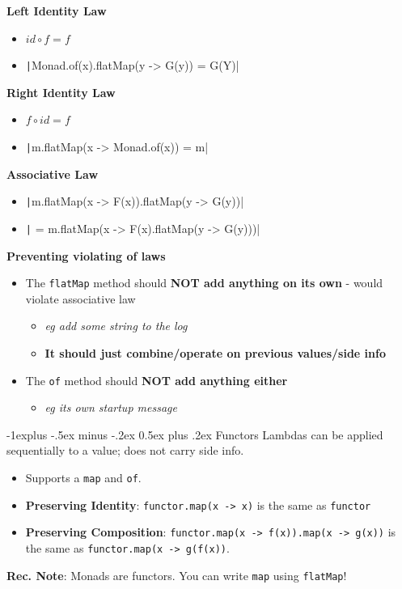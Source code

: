 \documentclass[10pt, landscape]{article}
\makeatletter
\renewcommand{\subsection}{\@startsection{subsection}{2}{0mm}%
                                {-1explus -.5ex minus -.2ex}%
                                {0.5ex plus .2ex}%
                                {\normalfont\normalsize\bfseries}}
\newcommand{\code}[1]{\textcolor{mygreen}{\texttt{#1}}}
\newcommand{\java}[1]{\texttt|#1|}
\makeatother
\begin{document}
\begin{multicols}{2}
\textbf{Left Identity Law}
\begin{itemize}
    \item $id \circ f=f$
    \item \java{Monad.of(x).flatMap(y -> G(y)) = G(Y)}
\end{itemize}
\textbf{Right Identity Law}
\begin{itemize}
    \item $f \circ id = f$
    \item \java{m.flatMap(x -> Monad.of(x)) = m}
\end{itemize}
\textbf{Associative Law}
\begin{itemize}
    \item \java{m.flatMap(x -> F(x)).flatMap(y -> G(y))} 
    \item \java{ = m.flatMap(x -> F(x).flatMap(y -> G(y)))}
\end{itemize}
\vspace{3 pt}
\textbf{Preventing violating of laws}
\begin{itemize}
    \item The \code{flatMap} method should \textbf{NOT add anything on its own} - would violate associative law
    \begin{itemize}
        \item \textit{eg add some string to the log}
        \item \textbf{It should just combine/operate on previous values/side info}
    \end{itemize}
    \item The \code{of} method should \textbf{NOT add anything either}
    \begin{itemize}
        \item \textit{eg its own startup message}
    \end{itemize}
\end{itemize}


\subsection{Functors}
Lambdas can be applied sequentially to a value; does not carry side info. 
\begin{itemize}
    \item Supports a \code{map} and \code{of}.
    \item \textbf{Preserving Identity}: \code{functor.map(x -> x)} is the same as \code{functor}
    \item \textbf{Preserving Composition}: \code{functor.map(x -> f(x)).map(x -> g(x))} is the same as \code{functor.map(x -> g(f(x))}.
\end{itemize}
\textbf{Rec. Note}: Monads are functors. You can write \code{map} using \code{flatMap}!



\end{multicols}
\end{document}
